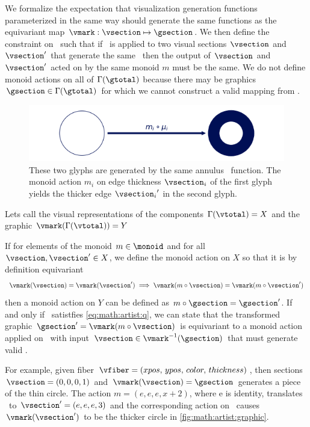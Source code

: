 \documentclass[../main.tex]{subfiles}
\begin{document}
We formalize the expectation that visualization generation functions parameterized in the same way should generate the same functions as the equivariant map $\vmark: \vsection \mapsto \gsection$. We then define the constraint on \vmark\ such that if \vmark\ is applied to two visual sections $\vsection$ and $\vsection^{\prime}$ that generate the same \gsection\, then the output of $\vsection$ and $\vsection^{\prime}$ acted on by the same monoid $m$ must be the same.  We do not define monoid actions on all of $\Gamma(\gtotal)$ because there may be graphics $\gsection \in \Gamma(\gtotal)$ for which we cannot construct a valid mapping from \vtotal.
\begin{figure}[htb]
  \centering
  \includegraphics[width=\textwidth]{figures/math/diff_type_q.png}
  \caption{These two glyphs are generated by the same annulus \vmark\ function. The monoid action $m_i$ on edge thickness $\vsection_i$ of the first glyph yields the thicker edge ${\vsection_i}^{\prime}$ in the second glyph.}
  \label{fig:math:artist:graphic}
\end{figure}
Lets call the visual representations of the components $\Gamma(\vtotal)=X$ and the graphic $\vmark(\Gamma(\vtotal))=Y$
\begin{prop}
If for elements of the monoid $m \in \monoid$ and for all $\vsection, \vsection^{\prime} \in X$, we define the monoid action on $X$ so that it is by definition equivariant
\begin{equation}
\vmark(\vsection) = \vmark(\vsection^{\prime})\implies \vmark(m\circ\vsection) = \vmark(m\circ\vsection^{\prime})
\label{eq:math:artist:q}
\end{equation}
then a monoid action on $Y$ can be defined as $m\circ \gsection = \gsection^{\prime}$. If and only if \vmark\ satistfies \autoref{eq:math:artist:q}, we can state that the transformed graphic $\gsection^{\prime}=\vmark(m\circ \vsection)$ is equivariant to a monoid action applied on \vmark\ with input $\vsection \in \vmark^{-1}(\gsection)$ that must generate valid \gsection. 
\end{prop}

For example, given fiber $\vfiber=(xpos,\, ypos,\, color,\, thickness)$, then sections $\vsection=(0,0,0,1)$ and $\vmark(\vsection) = \gsection$ generates a piece of the thin circle. The action $m=(e, e, e, x+2)$, where e is identity, translates \vsection\ to  $\vsection^{\prime}=(e,e,e,3)$ and the corresponding action on \gsection\ causes $\vmark(\vsection^{\prime})$ to be the thicker circle in \autoref{fig:math:artist:graphic}.
\end{document}
